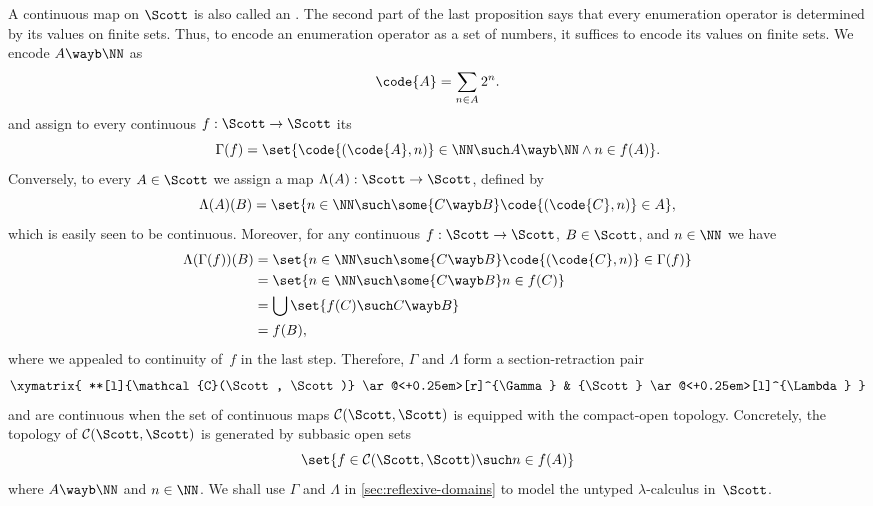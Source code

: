 A continuous map on $\Scott$ is also called an .
%
The second part of the last proposition says that every enumeration operator is determined by its values on finite sets. Thus, to encode an enumeration operator as a set of numbers, it suffices to encode its values on finite sets.
We encode $A \wayb \NN$ as
%
\begin{equation*}
  \code{A} = \sum_{n \in A} 2^n.
\end{equation*}
%
and assign to every continuous $f : \Scott \to \Scott$ its
%
\begin{equation*}
  \Gamma(f) = \set{\code{(\code{A}, n)} \in \NN \such
    A \wayb \NN \land n \in f(A)
  }.
\end{equation*}
%
Conversely, to every $A \in \Scott$ we assign a map $\Lambda(A) : \Scott \to \Scott$, defined by
%
\begin{equation*}
  \Lambda(A)(B) = \set{n \in \NN \such
    \some{C \wayb B} \code{(\code{C}, n)} \in A
  },
\end{equation*}
%
which is easily seen to be continuous.
Moreover, for any continuous $f : \Scott \to \Scott$, $B \in \Scott$, and $n \in \NN$ we have
%
\begin{align*}
  \Lambda(\Gamma(f))(B)
  &= \set{n \in \NN \such \some{C \wayb B} \code{(\code{C}, n)} \in \Gamma(f)} \\
  &= \set{n \in \NN \such \some{C \wayb B} n \in f(C)} \\
  &= \bigcup \set{f(C) \such C \wayb B} \\
  &= f(B),
\end{align*}
%
where we appealed to continuity of~$f$ in the last step.
%
Therefore, $\Gamma$ and $\Lambda$ form a section-retraction pair
%
\begin{equation}
  \label{eq:scott-section-retraction}
  \xymatrix{
    **[l]{\mathcal{C}(\Scott, \Scott)}
    \ar@<+0.25em>[r]^{\Gamma}
    &
    {\Scott}
    \ar@<+0.25em>[l]^{\Lambda}
  }
\end{equation}
%
and are continuous when the set of continuous maps $\mathcal{C}(\Scott, \Scott)$ is equipped with the compact-open topology. Concretely, the topology of $\mathcal{C}(\Scott, \Scott)$ is generated by subbasic open sets
%
\begin{equation*}
  \set{ f \in \mathcal{C}(\Scott, \Scott) \such
        n \in f(A)
  }
\end{equation*}
%
where $A \wayb \NN$ and $n \in \NN$.
%
We shall use $\Gamma$ and $\Lambda$ in \cref{sec:reflexive-domains} to model the untyped $\lambda$-calculus in~$\Scott$.

